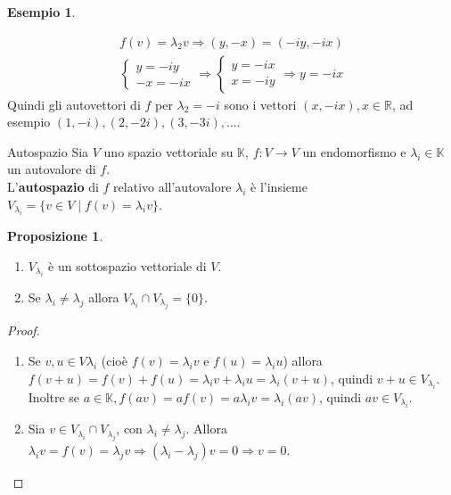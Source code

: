\documentclass[a4paper]{article}
\theoremstyle{definition}
\newtheorem*{es}{Esempio}
\newtheorem*{prop}{Proposizione}
\begin{document}
\begin{es}
\begin{itemize}
\begin{align*}
					f(v) = \lambda_2 v \Rightarrow (y, -x) = (-iy, -ix) \\
					\begin{cases}
						y = - iy \\
						- x = - ix
					\end{cases} \Rightarrow \begin{cases}
						y = - ix \\
						x = - iy
					\end{cases} \Rightarrow y = - ix
				\end{align*}
				Quindi gli autovettori di $f$ per $\lambda_2 = -i$ sono i vettori $(x, -ix), x \in \mathbb{R}$, ad esempio $(1, -i), (2, -2i), (3, -3i), ...$.
		\end{itemize}
	\end{es}

	\begin{deff}{Autospazio}{}
		Sia $V$ uno spazio vettoriale su $\mathbb{K}$, $f: V \to V$ un endomorfismo e $\lambda_i \in \mathbb{K}$ un autovalore di $f$. \\
		L'\textbf{autospazio} di $f$ relativo all'autovalore $\lambda_i$ è l'insieme $V_{\lambda_i} = \{v \in V \mid f(v) = \lambda_i v\}$.
	\end{deff}
	\begin{prop}
		\begin{enumerate}
			\item $V_{\lambda_i}$ è un sottospazio vettoriale di $V$.
			\item Se $\lambda_i \ne \lambda_j$ allora $V_{\lambda_i} \cap V_{\lambda_j} = \{0\}$.
		\end{enumerate}
	\end{prop}
	\begin{proof}
		\begin{enumerate}
			\item Se $v, u \in V\lambda_i$ (cioè $f(v) = \lambda_i v$ e $f(u) = \lambda_i u$) allora $f(v + u) = f(v) + f(u) = \lambda_i v + \lambda_i u = \lambda_i(v + u)$,
				quindi $v + u \in V_{\lambda_i}$.
				Inoltre se $a \in \mathbb{K}, f(av) = af(v) = a\lambda_i v = \lambda_i (av)$, quindi $av \in V_{\lambda_i}$.
			\item Sia $v \in V_{\lambda_i} \cap V_{\lambda_j}$, con $\lambda_i \ne \lambda_j$.
				Allora $\lambda_i v = f(v) = \lambda_j v \Rightarrow (\lambda_i - \lambda_j)v = 0 \Rightarrow v = 0$.
		\end{enumerate}
	\end{proof}
\end{document}
